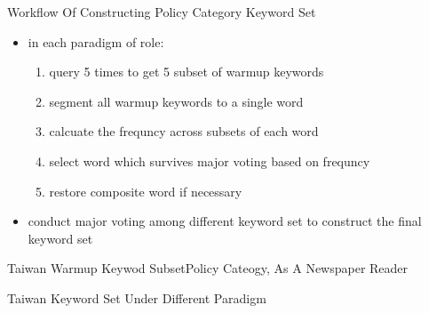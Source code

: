 \documentclass[12pt]{beamer}
\begin{document}
\begin{frame}{Workflow Of Constructing Policy Category Keyword Set}
\begin{itemize}
    \item in each paradigm of role:
    \begin{enumerate}
        \item query 5 times to get 5 subset of warmup keywords
        \item segment all warmup keywords to a single word
        \item calcuate the frequncy across subsets of each word
        \item select word which survives major voting based on frequncy
        \item restore composite word if necessary
    \end{enumerate}
    \item conduct major voting among different keyword set to construct the final keyword set
\end{itemize}
\end{frame}


\begin{frame}{Taiwan Warmup Keywod Subset}{Policy Cateogy, As A Newspaper Reader}
\begin{table}[H]
\renewcommand\arraystretch{1.4}
\begin{adjustwidth}{-0.0cm}{}
\begin{center}
\setlength{\tabcolsep}{15pt}
{
    \fontsize{6}{6} \selectfont
    
}
\end{center}
\end{adjustwidth}
\end{table}
\end{frame}


\begin{frame}{Taiwan Keyword Set Under Different Paradigm}
\begin{table}[H]
\renewcommand\arraystretch{1.6}
\begin{adjustwidth}{-0.0cm}{}
\begin{center}
\setlength{\tabcolsep}{12pt}
{
    \fontsize{10}{8} \selectfont
    
}
\end{center}
\end{adjustwidth}
\end{table}
\end{frame}
\end{document}
